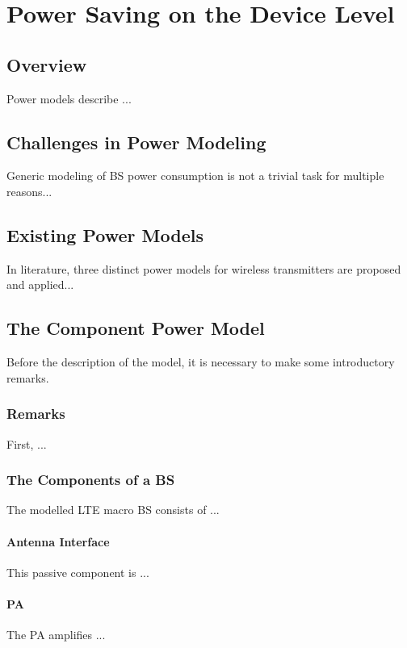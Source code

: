 \chapter{Power Saving on the Device Level}
\label{ch:device}

\section{Overview}
Power models describe ...

\section{Challenges in Power Modeling}
\label{ch3:challenges}
Generic modeling of \ac{BS} power consumption is not a trivial task for multiple reasons...

\section{Existing Power Models}
\label{ch3:existing}
In literature, three distinct power models for wireless transmitters are proposed and applied...

\section{The Component Power Model}
\label{ch3:componentmodel}
Before the description of the model, it is necessary to make some introductory remarks.

\subsection{Remarks}

First, ...

\subsection{The Components of a \ac{BS}}
The modelled \ac{LTE} macro \ac{BS} consists of ...

\subsubsection{Antenna Interface}
This passive component is ...

\subsubsection{\ac{PA}}
The \ac{PA} amplifies ...


